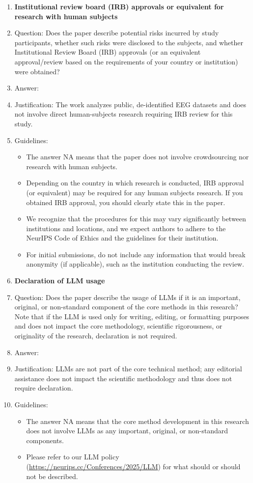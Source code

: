 \documentclass{article}
\begin{document}
\begin{enumerate}
\item {\bf Institutional review board (IRB) approvals or equivalent for research with human subjects}
    \item[] Question: Does the paper describe potential risks incurred by study participants, whether such risks were disclosed to the subjects, and whether Institutional Review Board (IRB) approvals (or an equivalent approval/review based on the requirements of your country or institution) were obtained?
    \item[] Answer: \answerNA{}
    \item[] Justification: The work analyzes public, de-identified EEG datasets and does not involve direct human-subjects research requiring IRB review for this study.
    \item[] Guidelines:
    \begin{itemize}
        \item The answer NA means that the paper does not involve crowdsourcing nor research with human subjects.
        \item Depending on the country in which research is conducted, IRB approval (or equivalent) may be required for any human subjects research. If you obtained IRB approval, you should clearly state this in the paper. 
        \item We recognize that the procedures for this may vary significantly between institutions and locations, and we expect authors to adhere to the NeurIPS Code of Ethics and the guidelines for their institution. 
        \item For initial submissions, do not include any information that would break anonymity (if applicable), such as the institution conducting the review.
    \end{itemize}

\item {\bf Declaration of LLM usage}
    \item[] Question: Does the paper describe the usage of LLMs if it is an important, original, or non-standard component of the core methods in this research? Note that if the LLM is used only for writing, editing, or formatting purposes and does not impact the core methodology, scientific rigorousness, or originality of the research, declaration is not required.
    \item[] Answer: \answerNA{}
    \item[] Justification: LLMs are not part of the core technical method; any editorial assistance does not impact the scientific methodology and thus does not require declaration.
    \item[] Guidelines:
    \begin{itemize}
        \item The answer NA means that the core method development in this research does not involve LLMs as any important, original, or non-standard components.
        \item Please refer to our LLM policy (\url{https://neurips.cc/Conferences/2025/LLM}) for what should or should not be described.
    \end{itemize}

\end{enumerate}
\end{document}
